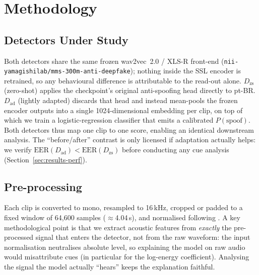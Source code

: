 \documentclass[sigconf]{acmart}
\begin{document}
\section{Methodology}

\subsection{Detectors Under Study}
Both detectors share the same frozen wav2vec~2.0 / XLS-R front-end
(\texttt{nii-yamagishilab/mms-300m-anti-deepfake}); nothing inside the SSL encoder
is retrained, so any behavioural difference is attributable to the read-out alone.
$D_\mathrm{zs}$ (zero-shot) applies the checkpoint's original anti-spoofing head
directly to pt-BR. $D_\mathrm{ad}$ (lightly adapted) discards that head and instead
mean-pools the frozen encoder outputs into a single 1024-dimensional embedding per
clip, on top of which we train a logistic-regression classifier that emits a
calibrated $P(\mathrm{spoof})$. Both detectors thus map one clip to one score,
enabling an identical downstream analysis. The ``before/after'' contrast is only
licensed if adaptation actually helps: we verify
$\mathrm{EER}(D_\mathrm{ad})<\mathrm{EER}(D_\mathrm{zs})$ before conducting any cue
analysis (Section~\ref{sec:results-perf}).

\subsection{Pre-processing}
Each clip is converted to mono, resampled to 16\,kHz, cropped or padded to a fixed
window of 64{,}600 samples ($\approx$4.04\,s), and normalised following
\citet{tak2022automatic}. A key methodological point is that we extract acoustic
features from \emph{exactly} the pre-processed signal that enters the detector, not
from the raw waveform: the input normalisation neutralises absolute level, so
explaining the model on raw audio would misattribute cues (in particular for the
log-energy coefficient). Analysing the signal the model actually ``hears'' keeps the
explanation faithful.
\end{document}
